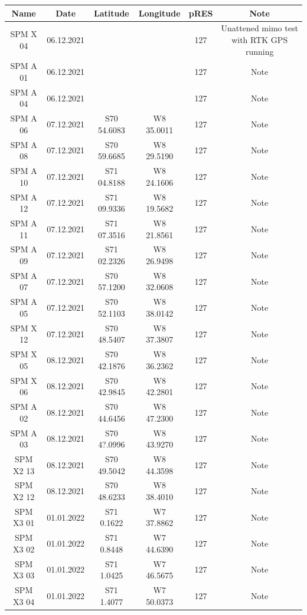 \documentclass[a4paper,12pt]{article}
\begin{document}
\begin{table}[H]
  \tiny
  \centering
  \begin{tabular}[width=\textwidth]{c c c c c c}
    \rowcolor{gray!50}
    Name & Date & Latitude & Longitude & pRES & Note\\
    \hline
    SPM X 04 & 06.12.2021 &  &  & 127 & Unattened mimo test with RTK GPS running \\ 
    SPM A 01 & 06.12.2021 &  &  & 127 & Note \\
    SPM A 04 & 06.12.2021 &  &  & 127 & Note \\
    SPM A 06 & 07.12.2021 & S70 54.6083 & W8 35.0011 & 127 & Note \\
    SPM A 08 & 07.12.2021 & S70 59.6685 & W8 29.5190 & 127 & Note \\
    SPM A 10 & 07.12.2021 & S71 04.8188 & W8 24.1606 & 127 & Note \\
    SPM A 12 & 07.12.2021 & S71 09.9336 & W8 19.5682 & 127 & Note \\
    SPM A 11 & 07.12.2021 & S71 07.3516 & W8 21.8561 & 127 & Note \\
    SPM A 09 & 07.12.2021 & S71 02.2326 & W8 26.9498 & 127 & Note \\
    SPM A 07 & 07.12.2021 & S70 57.1200 & W8 32.0608 & 127 & Note \\
    SPM A 05 & 07.12.2021 & S70 52.1103 & W8 38.0142 & 127 & Note \\
    SPM X 12 & 07.12.2021 & S70 48.5407 & W8 37.3807 & 127 & Note \\
    SPM X 05 & 08.12.2021 & S70 42.1876 & W8 36.2362 & 127 & Note \\
    SPM X 06 & 08.12.2021 & S70 42.9845 & W8 42.2801 & 127 & Note \\
    SPM A 02 & 08.12.2021 & S70 44.6456 & W8 47.2300 & 127 & Note \\
    SPM A 03 & 08.12.2021 & S70 4?.0996 & W8 43.9270 & 127 & Note \\
    SPM X2 13 & 08.12.2021 & S70 49.5042 & W8 44.3598 & 127 & Note \\
    SPM X2 12 & 08.12.2021 & S70 48.6233 & W8 38.4010 & 127 & Note \\
    SPM X3 01 & 01.01.2022 & S71 0.1622 & W7 37.8862 & 127 & Note \\
    SPM X3 02 & 01.01.2022 & S71 0.8448 & W7 44.6390 & 127 & Note \\
    SPM X3 03 & 01.01.2022 & S71 1.0425 & W7 46.5675 & 127 & Note \\
    SPM X3 04 & 01.01.2022 & S71 1.4077 & W7 50.0373 & 127 & Note \\

\end{tabular}
\end{table}
\end{document}
